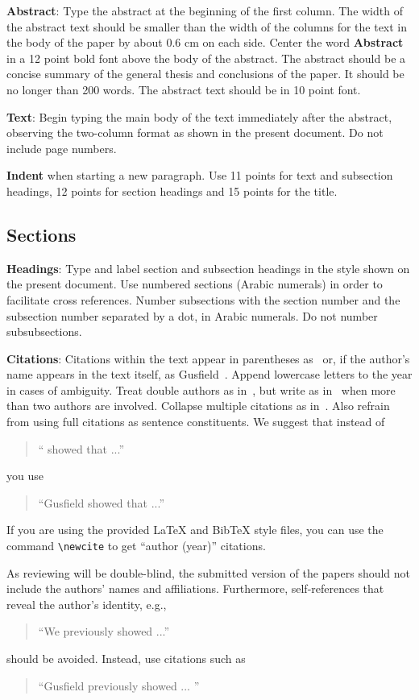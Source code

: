\documentclass[11pt]{article}
\begin{document}
{\bf Abstract}: Type the abstract at the beginning of the first
column. The width of the abstract text should be smaller than the
width of the columns for the text in the body of the paper by about
0.6 cm on each side. Center the word {\bf Abstract} in a 12 point bold
font above the body of the abstract. The abstract should be a concise
summary of the general thesis and conclusions of the paper. It should
be no longer than 200 words. The abstract text should be in 10 point font.

{\bf Text}: Begin typing the main body of the text immediately after
the abstract, observing the two-column format as shown in 
the present document. Do not include page numbers.

{\bf Indent} when starting a new paragraph. Use 11 points for text and 
subsection headings, 12 points for section headings and 15 points for
the title. 

\subsection{Sections}

{\bf Headings}: Type and label section and subsection headings in the
style shown on the present document.  Use numbered sections (Arabic
numerals) in order to facilitate cross references. Number subsections
with the section number and the subsection number separated by a dot,
in Arabic numerals. Do not number subsubsections.

{\bf Citations}: Citations within the text appear
in parentheses as~\cite{Gusfield:97} or, if the author's name appears in
the text itself, as Gusfield~. 
Append lowercase letters to the year in cases of ambiguity.  
Treat double authors as in~\cite{Aho:72}, but write as
 in~\cite{Chandra:81} when more than two authors are involved. Collapse multiple citations as
in~\cite{Gusfield:97,Aho:72}. Also refrain from using full citations as sentence constituents. We
suggest that instead of
\begin{quote}
  ``\cite{Gusfield:97} showed that ...''
\end{quote}
you use
\begin{quote}
``Gusfield    showed that ...''
\end{quote}

If you are using the provided \LaTeX{} and Bib\TeX{} style files, you
can use the command \verb|\newcite| to get ``author (year)'' citations.

As reviewing will be double-blind, the submitted version of the papers should not include the
authors' names and affiliations. Furthermore, self-references that
reveal the author's identity, e.g.,
\begin{quote}
``We previously showed \cite{Gusfield:97} ...''  
\end{quote}
should be avoided. Instead, use citations such as 
\begin{quote}
``Gusfield 
previously showed ... ''
\end{quote}
\end{document}
